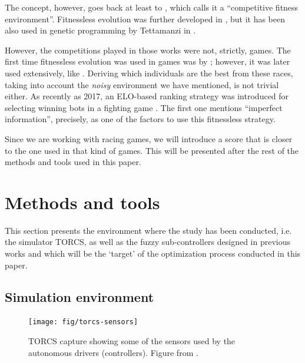 \documentclass[10pt,journal,compsoc]{IEEEtran}
\begin{document}
The concept, however, goes back at least to
\cite{Angeline:1993:CEE:645513.657590}, which calls it a ``competitive
fitness environment''. Fitnessless evolution was further developed in
\cite{rosin1995methods}, but it has been also used in genetic
programming by Tettamanzi in \cite{tettamanzi1996genetic}.

However, the competitions played in those works were not, strictly,
games. The first time fitnessless evolution was used in  games was by
\cite{luke1998genetic}; however, it was later used extensively, like
\cite{Jaskowski2008,10.1007/978-3-540-78671-9_2,alhejali2011using,DBLP:conf/evoW/Fernandez-AresG16}. Deriving which individuals are the best from these races, taking into account
the {\em noisy} environment we have mentioned, is not trivial
either. As recently as 2017, an ELO-based ranking strategy was
introduced for selecting winning bots in a fighting game
\cite{7792145}. The first one mentions ``imperfect information'',
precisely, as one of the factors to use this fitnessless strategy.

Since we are working with racing games, we will introduce a score that
is closer to the one used in that kind of games. This will be
presented after the rest of the methods and tools used in this paper. 



\section{Methods and tools}
\label{sec:methods}

This section presents the environment where the study has been conducted, i.e. the simulator TORCS, as well as the fuzzy sub-controllers designed in previous works and which will be the `target' of the optimization process conducted in this paper. 

%
\subsection{Simulation environment}

\begin{figure}[!ht] 
	\begin{center}
		\texttt{[image: fig/torcs-sensors]}
		\caption {TORCS capture showing some of the sensors
                used by the autonomous drivers (controllers). Figure from \cite{DBLP:conf/cig/SalemMG19}.}
		\label{fig:torcs-sensors}
	\end{center}
\end{figure}
\end{document}
